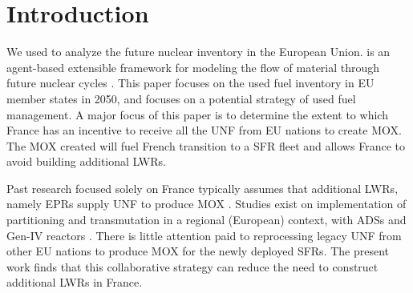 \begin{abstract}
The French 2012-2015 Commission Nationale d'Evaluation reports
\cite{noauthor_cne2_nodate} emphasize preparation for a transition from \glspl{LWR} to \glspl{SFR}.
This paper uses \Cyclus to explore the feasibility of using \gls{UNF} from other EU nations
for French transition into a \gls{SFR} fleet without additional construction of \glspl{LWR}.
A \Cyclus simulation ran from 1950 to 2160 for EU to track the \gls{UNF} mass
and tails inventory to support
the transition into \glspl{SFR} (66GWe - 110 \glspl{SFR}). The study concludes that France can avoid deployment
of additional \glspl{LWR} by accepting \gls{UNF} from other EU nations.
\end{abstract}

\section{Introduction}
We used \Cyclus to analyze
the future nuclear inventory in the European Union. \Cyclus is an agent-based extensible
framework for modeling the flow of material through future nuclear cycles \cite{huff_fundamental_2016}.
This paper focuses on the used fuel
inventory in \gls{EU} member states in 2050, and focuses on a potential strategy of used fuel
management.
A major focus of this paper is to determine the extent to which France has an incentive
to receive all the \gls{UNF} from \gls{EU} nations to create \gls{MOX}.
The \gls{MOX} created will fuel French transition to a \gls{SFR} fleet
and allows France to avoid building additional \glspl{LWR}.

Past research focused solely on France typically assumes that additional \glspl{LWR},
namely \glspl{EPR} supply \gls{UNF} to produce \gls{MOX} \cite{carre_overview_2009, martin_symbiotic_2017, freynet_multiobjective_2016}.
Studies exist on implementation of partitioning and transmutation
in a regional (European) context, with \glspl{ADS} and Gen-IV reactors \cite{fazio_study_2013}.
There is little attention paid to reprocessing legacy \gls{UNF} from other
EU nations to produce \gls{MOX} for the newly deployed \glspl{SFR}.
The present work finds that this collaborative strategy can reduce the
need to construct additional \glspl{LWR} in France.

